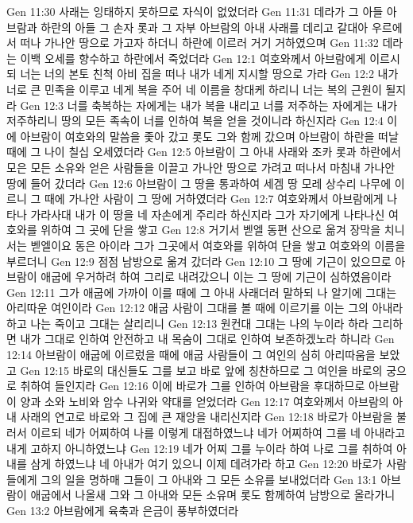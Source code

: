 Gen 11:30  사래는 잉태하지 못하므로 자식이 없었더라
Gen 11:31  데라가 그 아들 아브람과 하란의 아들 그 손자 롯과 그 자부 아브람의 아내 사래를 데리고 갈대아 우르에서 떠나 가나안 땅으로 가고자 하더니 하란에 이르러 거기 거하였으며
Gen 11:32  데라는 이백 오세를 향수하고 하란에서 죽었더라
Gen 12:1  여호와께서 아브람에게 이르시되 너는 너의 본토 친척 아비 집을 떠나 내가 네게 지시할 땅으로 가라
Gen 12:2  내가 너로 큰 민족을 이루고 네게 복을 주어 네 이름을 창대케 하리니 너는 복의 근원이 될지라
Gen 12:3  너를 축복하는 자에게는 내가 복을 내리고 너를 저주하는 자에게는 내가 저주하리니 땅의 모든 족속이 너를 인하여 복을 얻을 것이니라 하신지라
Gen 12:4  이에 아브람이 여호와의 말씀을 좇아 갔고 롯도 그와 함께 갔으며 아브람이 하란을 떠날 때에 그 나이 칠십 오세였더라
Gen 12:5  아브람이 그 아내 사래와 조카 롯과 하란에서 모은 모든 소유와 얻은 사람들을 이끌고 가나안 땅으로 가려고 떠나서 마침내 가나안 땅에 들어 갔더라
Gen 12:6  아브람이 그 땅을 통과하여 세겜 땅 모레 상수리 나무에 이르니 그 때에 가나안 사람이 그 땅에 거하였더라
Gen 12:7  여호와께서 아브람에게 나타나 가라사대 내가 이 땅을 네 자손에게 주리라 하신지라 그가 자기에게 나타나신 여호와를 위하여 그 곳에 단을 쌓고
Gen 12:8  거기서 벧엘 동편 산으로 옮겨 장막을 치니 서는 벧엘이요 동은 아이라 그가 그곳에서 여호와를 위하여 단을 쌓고 여호와의 이름을 부르더니
Gen 12:9  점점 남방으로 옮겨 갔더라
Gen 12:10  그 땅에 기근이 있으므로 아브람이 애굽에 우거하려 하여 그리로 내려갔으니 이는 그 땅에 기근이 심하였음이라
Gen 12:11  그가 애굽에 가까이 이를 때에 그 아내 사래더러 말하되 나 알기에 그대는 아리따운 여인이라
Gen 12:12  애굽 사람이 그대를 볼 때에 이르기를 이는 그의 아내라 하고 나는 죽이고 그대는 살리리니
Gen 12:13  원컨대 그대는 나의 누이라 하라 그리하면 내가 그대로 인하여 안전하고 내 목숨이 그대로 인하여 보존하겠노라 하니라
Gen 12:14  아브람이 애굽에 이르렀을 때에 애굽 사람들이 그 여인의 심히 아리따움을 보았고
Gen 12:15  바로의 대신들도 그를 보고 바로 앞에 칭찬하므로 그 여인을 바로의 궁으로 취하여 들인지라
Gen 12:16  이에 바로가 그를 인하여 아브람을 후대하므로 아브람이 양과 소와 노비와 암수 나귀와 약대를 얻었더라
Gen 12:17  여호와께서 아브람의 아내 사래의 연고로 바로와 그 집에 큰 재앙을 내리신지라
Gen 12:18  바로가 아브람을 불러서 이르되 네가 어찌하여 나를 이렇게 대접하였느냐 네가 어찌하여 그를 네 아내라고 내게 고하지 아니하였느냐
Gen 12:19  네가 어찌 그를 누이라 하여 나로 그를 취하여 아내를 삼게 하였느냐 네 아내가 여기 있으니 이제 데려가라 하고
Gen 12:20  바로가 사람들에게 그의 일을 명하매 그들이 그 아내와 그 모든 소유를 보내었더라
Gen 13:1  아브람이 애굽에서 나올새 그와 그 아내와 모든 소유며 롯도 함께하여 남방으로 올라가니
Gen 13:2  아브람에게 육축과 은금이 풍부하였더라
